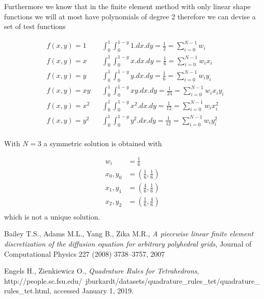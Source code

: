 \documentclass[11pt,letterpaper,titlepage]{article}
\newcommand{\beq}{\begin{equation*}
\begin{aligned}}
\newcommand{\eeq}{\end{aligned}
\end{equation*}}
\begin{document}
\begin{appendices}
Furthermore we know that in the finite element method with only linear shape functions we will at most have polynomials of degree 2 therefore we can devise a set of test functions

\beq 
&f(x,y) = 1    &&\int_{0}^1 \int_0^{1-y} 1.dx.dy = \frac{1}{2} = \sum_{i=0}^{N-1} w_i\\
&f(x,y) = x    &&\int_{0}^1 \int_0^{1-y} x.dx.dy = \frac{1}{6} = \sum_{i=0}^{N-1} w_i x_i\\
&f(x,y) = y    &&\int_{0}^1 \int_0^{1-y} y.dx.dy = \frac{1}{6} = \sum_{i=0}^{N-1} w_i y_i\\
&f(x,y) = xy  & &\int_{0}^1 \int_0^{1-y} xy.dx.dy = \frac{1}{24} = \sum_{i=0}^{N-1} w_i x_i y_i\\
&f(x,y) = x^2    &&\int_{0}^1 \int_0^{1-y} x^2.dx.dy = \frac{1}{12} = \sum_{i=0}^{N-1} w_i x_i^2\\
&f(x,y) = y^2    &&\int_{0}^1 \int_0^{1-y} y^2.dx.dy = \frac{1}{12} = \sum_{i=0}^{N-1} w_i y_i^2\\
\eeq 

With $N=3$ a symmetric solution is obtained with

\beq
w_i &= \frac{1}{6} \\
x_0,y_0 &= ( \frac{1}{6}, \frac{1}{6}) \\
x_1,y_1 &= ( \frac{4}{6}, \frac{1}{6}) \\
x_2,y_2 &= ( \frac{1}{6}, \frac{4}{6}) \\
\eeq 
which is not a unique solution.


\end{appendices}

\newpage
{}
\begin{thebibliography}{1}
    
      Bailey T.S., Adams M.L., Yang B., Zika M.R., {\em A piecewise linear finite element discretization of the diffusion equation for arbitrary polyhedral grids}, Journal of Computational Physics 227 (2008) 3738–3757, 2007
    
     Engels H., Zienkiewicz O., {\em Quadrature Rules for Tetrahedrons}, http://people.sc.fsu.edu/~jburkardt/datasets/quadrature\_rules\_tet/quadrature\_rules\_tet.html, accessed January 1, 2019.
    
    
\end{thebibliography}
\end{document}

